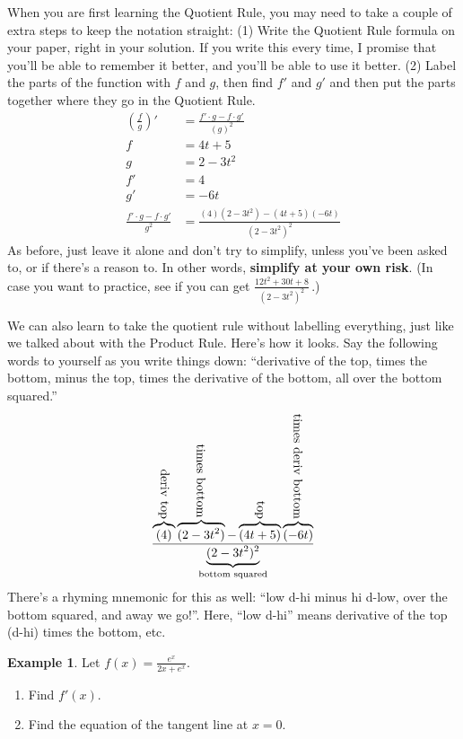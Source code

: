 \documentclass[oneside]{book}
\theoremstyle{definition}
\newtheorem{example}{Example}
\theoremstyle{solution}
\newtheorem*{solution}{Solution}
\newenvironment{solution}{\vspace{2in}\comment}{\endcomment}
\begin{document}
\begin{solution} 
  When you are first learning the Quotient Rule, you may need to take
  a couple of extra steps to keep the notation straight: (1) Write the
  Quotient Rule formula on your paper, right in your solution.  If you
  write this every time, I promise that you'll be able to remember it
  better, and you'll be able to use it better.  (2) Label the parts of
  the function with $f$ and $g$, then find $f'$ and $g'$ and then put
  the parts together where they go in the Quotient Rule.
\begin{align*}
\left(\frac{f}{g}\right)' & = \frac{f'\cdot g - f\cdot g'}{(g)^2}\\
f & = 4t+5\\
g & = 2-3t^2\\
f' & = 4\\
g' & = -6t\\
\frac{f'\cdot g - f\cdot g'}{g^2} & = \frac{(4)(2-3t^2)-(4t+5)(-6t)}{(2-3t^2)^2}
\end{align*}
As before, just leave it alone and don't try to simplify, unless
you've been asked to, or if there's a reason to.  In other words,
\textbf{simplify at your own risk}.  (In case you want to practice,
see if you can get $\frac{12t^2+30t + 8}{\left(2-3t^2\right)^2}$\,.)


We can also learn to take the quotient rule without labelling
everything, just like we talked about with the Product Rule.  Here's
how it looks.  Say the following words to yourself as you write things
down: ``derivative of the top, times the bottom, minus the top, times
the derivative of the bottom, all over the bottom squared.''
$$
\frac{
\overbrace{(4)}^{\rotatebox{-90}{deriv top}}
\overbrace{(2-3t^2)}^{\rotatebox{-90}{times bottom}}
-
\overbrace{(4t+5)}^{\rotatebox{-90}{top}}
\overbrace{(-6t)}^{\rotatebox{-90}{times deriv bottom}}
}
{
\underbrace{(2-3t^2)^2}_{\text{bottom squared}}
}
$$
There's a rhyming mnemonic for this as well: ``low d-hi minus hi
d-low, over the bottom squared, and away we go!''.  Here, ``low d-hi''
means derivative of the top (d-hi) times the bottom, etc.
\end{solution}

\begin{example}
Let $f(x) = \frac{e^x}{2x+e^x}$.  
  \begin{enumerate}
  \item Find $f'(x)$.
  \item Find the equation of the tangent line at $x = 0$.
  \end{enumerate}
\end{example}
\end{document}
